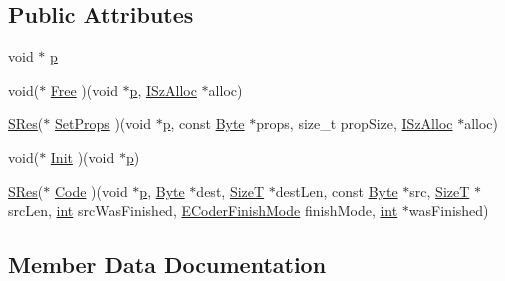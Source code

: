 \subsection*{Public Attributes}
\begin{DoxyCompactItemize}
\item 
void $\ast$ \mbox{\hyperlink{struct___i_state_coder_a7956e4f358a8e8a3e0e03f19691d2305}{p}}
\item 
void($\ast$ \mbox{\hyperlink{struct___i_state_coder_ac1786b2607edbd446a7f2ac97f39edd1}{Free}} )(void $\ast$\mbox{\hyperlink{struct___i_state_coder_a7956e4f358a8e8a3e0e03f19691d2305}{p}}, \mbox{\hyperlink{struct_i_sz_alloc}{I\+Sz\+Alloc}} $\ast$alloc)
\item 
\mbox{\hyperlink{7z_types_8h_acc0053eeb62726b68b22e8c7d9e91367}{S\+Res}}($\ast$ \mbox{\hyperlink{struct___i_state_coder_a3d62dedf9587360c47c92035f955f72a}{Set\+Props}} )(void $\ast$\mbox{\hyperlink{struct___i_state_coder_a7956e4f358a8e8a3e0e03f19691d2305}{p}}, const \mbox{\hyperlink{7z_types_8h_ae3a497195d617519e5353ea7b417940f}{Byte}} $\ast$props, size\+\_\+t prop\+Size, \mbox{\hyperlink{struct_i_sz_alloc}{I\+Sz\+Alloc}} $\ast$alloc)
\item 
void($\ast$ \mbox{\hyperlink{struct___i_state_coder_a6a9719579a2d5c237c2d135b23ccb458}{Init}} )(void $\ast$\mbox{\hyperlink{struct___i_state_coder_a7956e4f358a8e8a3e0e03f19691d2305}{p}})
\item 
\mbox{\hyperlink{7z_types_8h_acc0053eeb62726b68b22e8c7d9e91367}{S\+Res}}($\ast$ \mbox{\hyperlink{struct___i_state_coder_afc71048cc7182ec714a1c58ea2e44f7a}{Code}} )(void $\ast$\mbox{\hyperlink{struct___i_state_coder_a7956e4f358a8e8a3e0e03f19691d2305}{p}}, \mbox{\hyperlink{7z_types_8h_ae3a497195d617519e5353ea7b417940f}{Byte}} $\ast$dest, \mbox{\hyperlink{7z_types_8h_a4f8e2163e01de507a0ac376e8ec2b796}{SizeT}} $\ast$dest\+Len, const \mbox{\hyperlink{7z_types_8h_ae3a497195d617519e5353ea7b417940f}{Byte}} $\ast$src, \mbox{\hyperlink{7z_types_8h_a4f8e2163e01de507a0ac376e8ec2b796}{SizeT}} $\ast$src\+Len, \mbox{\hyperlink{ioapi_8h_a787fa3cf048117ba7123753c1e74fcd6}{int}} src\+Was\+Finished, \mbox{\hyperlink{_xz_8h_ac449eaa46953542d10dbe2919e817e8e}{E\+Coder\+Finish\+Mode}} finish\+Mode, \mbox{\hyperlink{ioapi_8h_a787fa3cf048117ba7123753c1e74fcd6}{int}} $\ast$was\+Finished)
\end{DoxyCompactItemize}


\subsection{Member Data Documentation}
\mbox{\label{struct___i_state_coder_afc71048cc7182ec714a1c58ea2e44f7a}} 
